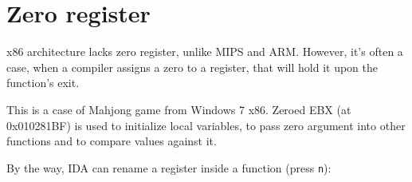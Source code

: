 \section{Zero register}

x86 architecture lacks zero register, unlike MIPS and ARM.
However, it's often a case, when a compiler assigns a zero to a register, that will hold it upon the function's exit.

This is a case of Mahjong game from Windows 7 x86.
Zeroed EBX (at 0x010281BF) is used to initialize local variables,
to pass zero argument into other functions and to compare values against it.



By the way, IDA can rename a register inside a function (press \verb|n|):



